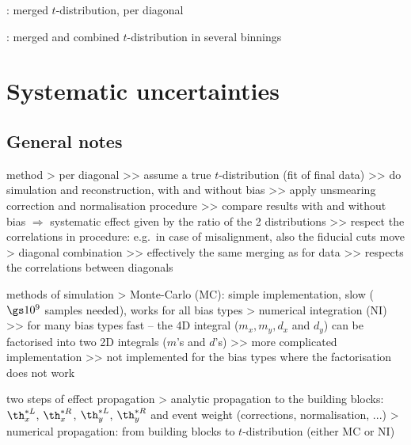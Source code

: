 \>  : merged $t$-distribution, per diagonal

\>  : merged and combined $t$-distribution in several binnings

\iffalse
\> \plot{t_distributions/t_dist_cmp_bunch.pdf} : comparison of $t$-distributions from different bunches (fill 5317)

\> \plot{t_distributions/t_dist_rel.pdf} : merged $t$-distribution in a relative reference frame
\fi



\chapter[systematics]{Systematic uncertainties}

\iffalse

\section[systematics-general]{General notes}

\> method
\>> per diagonal
\>>> assume a true $t$-distribution (fit of final data)
\>>> do simulation and reconstruction, with and without bias
\>>> apply unsmearing correction and normalisation procedure
\>>> compare results with and without bias $\Rightarrow$ systematic effect given by the ratio of the 2 distributions
\>>> respect the correlations in procedure: e.g.~in case of misalignment, also the fiducial cuts move
\>> diagonal combination
\>>> effectively the same merging as for data
\>>> respects the correlations between diagonals

 methods of simulation
\>> Monte-Carlo (MC): simple implementation, slow ($\gs 10^9$ samples needed), works for all bias types
\>> numerical integration (NI)
\>>> for many bias types fast -- the 4D integral ($m_x, m_y, d_x$ and $d_y$) can be factorised into two 2D integrals ($m$'s and $d$'s)
\>>> more complicated implementation
\>>> not implemented for the bias types where the factorisation does not work

\> two steps of effect propagation
\>> analytic propagation to the building blocks: $\th^{*L}_x$, $\th^{*R}_x$, $\th^{*L}_y$, $\th^{*R}_y$ and event weight (corrections, normalisation, ...)
\>> numerical propagation: from building blocks to $t$-distribution (either MC or NI)

